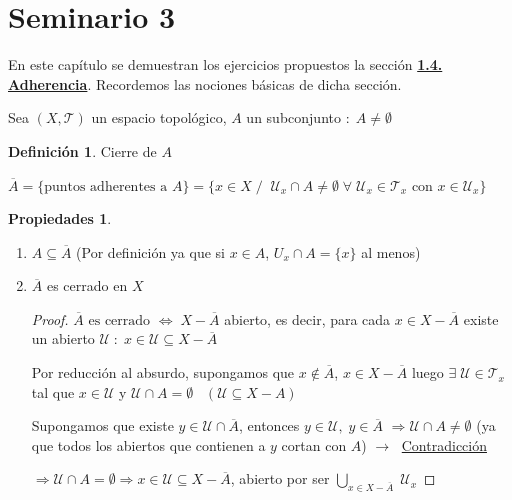 \documentclass[12pt,twoside]{report}
\newcommand\mc[1]{\mathcal{#1}}
\theoremstyle{azul}
\theoremstyle{azul2}
\theoremstyle{plain}
\theoremstyle{definition}
\newtheorem*{defi}{Definición}
\newtheorem*{propi}{Propiedades}
\theoremstyle{remark}
\begin{document}
\pagestyle{plain}
\section{Seminario 3} \label{P3}
En este capítulo se demuestran los ejercicios propuestos la sección \textbf{\textcolor{blue}{\hyperref[sec:adherencia]{1.4. Adherencia}}}. Recordemos las nociones básicas de dicha sección.

Sea $(X, \mc{T})$ un espacio topológico, $A$ un subconjunto $: \; A \neq \emptyset$
\begin{defi} Cierre de $A$

$\overline{A}=\{ \text{puntos adherentes a }A \}=\{ x \in X \; / \; \; \mc{U}_x \cap A \neq \emptyset \; \forall \; \mc{U}_x \in \mc{T}_x \text{ con } x \in \mc{U}_x\}$
\end{defi}
\begin{propi} \; \\
\vspace{-10mm}\begin{enumerate}
    \item $A \subseteq \overline{A}$ (Por definición ya que  si $x \in A$, $U_x \cap A=\{ x \}$ al menos)
    \item $\overline{A}$ es cerrado en $X$
    \begin{proof}
    $\overline{A} \text{ es cerrado } \Leftrightarrow \; X-\overline{A}$ abierto, es decir, para cada $x \in X-\overline{A}$ existe un abierto $\mc{U} \; : \; x \in \mc{U} \subseteq X-\overline{A}$ 
    
    Por reducción al absurdo, supongamos que $x \nin \overline{A}$, $x \in X-\overline{A}$ luego $\exists \; \mc{U} \in \mc{T}_x$ tal que $x \in \mc{U}$ y $\mc{U} \cap A = \emptyset \; \; \; (\mc{U} \subseteq X-A)$ 
    
    Supongamos que existe $y \in \mc{U} \cap \overline{A}$, entonces $y \in \mc{U}, \; y \in \overline{A}$ $\Rightarrow \mc{U} \cap A \neq \emptyset$ (ya que todos los abiertos que contienen a $y$ cortan con $A$) $\longrightarrow \;$ \underline{Contradicción}
    
    $\Rightarrow \mc{U} \cap A = \emptyset \Rightarrow x \in \mc{U} \subseteq X - \overline{A} $, abierto por ser $\underset{x \in X-\overline{A}}{\bigcup} \; \mc{U}_x$
    \end{proof}
    

\end{enumerate}
\end{propi}
\end{document}
